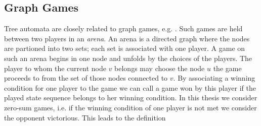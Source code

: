 \subsection{Graph Games}
Tree automata are closely related to graph games, e.g.
\cite[Chapter 9]{AutoLogInfGames}. Such games are held between two players in
an \emph{arena}. An arena is a directed graph where the nodes are partioned
into two sets; each set is associated with one player. A game on such an arena
begins in one node and unfolds by the choices of the players. The player to
whom the current node $v$ belongs may choose the node $u$ the game proceeds to
from the set of those nodes connected to $v$. By associating a winning
condition for one player to the game we can call a game won by this player if
the played state sequence belongs to her winning condition. In this thesis we
consider zero-sum games, i.e. if the winning condition of one player is not met
we consider the opponent victorious. This leads to the definition
